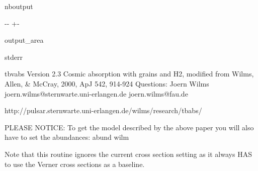 \documentclass[letterpaper,10pt,english]{sphinxmanual}
\newlength\nbsphinxcodecellspacing
\begin{document}
\begin{sphinxuseclass}{nboutput}
{

\kern-\sphinxverbatimsmallskipamount\kern-\baselineskip
\kern+\FrameHeightAdjust\kern-\fboxrule
\vspace{\nbsphinxcodecellspacing}

\begin{sphinxuseclass}{output_area}
\begin{sphinxuseclass}{stderr}


\begin{sphinxVerbatim}[commandchars=\\\{\}]
tbvabs Version 2.3
Cosmic absorption with grains and H2, modified from
Wilms, Allen, \& McCray, 2000, ApJ 542, 914-924
Questions: Joern Wilms
joern.wilms@sternwarte.uni-erlangen.de
joern.wilms@fau.de

http://pulsar.sternwarte.uni-erlangen.de/wilms/research/tbabs/

PLEASE NOTICE:
To get the model described by the above paper
you will also have to set the abundances:
   abund wilm

Note that this routine ignores the current cross section setting
as it always HAS to use the Verner cross sections as a baseline.
\end{sphinxVerbatim}



\end{sphinxuseclass}
\end{sphinxuseclass}
}

\end{sphinxuseclass}
\end{document}
